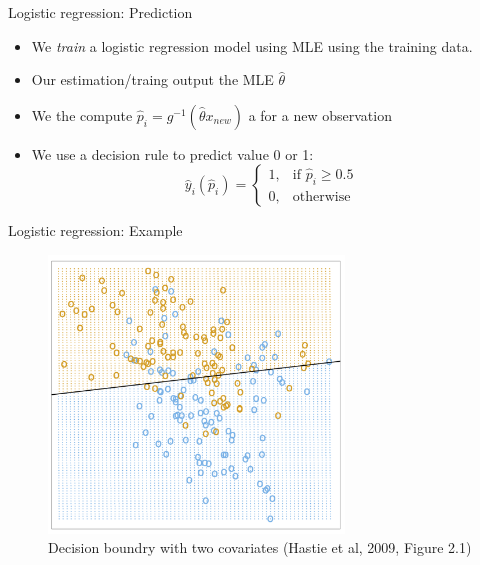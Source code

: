 \documentclass[10pt,handout]{beamer}
\begin{document}
\begin{frame}{Logistic regression: Prediction}
\begin{itemize}
\item We \emph{train} a logistic regression model using MLE using the training data.
\item Our estimation/traing output the MLE $\hat{\theta}$
\item We the compute $\hat{p}_i = g^{-1}(\hat{\theta} x_{new})$ a for a new observation
\item We use a {\color{uured} decision rule} to predict value 0 or 1:
\[
    \hat{y}_i(\hat{p}_i)=
\begin{cases}
    1,& \text{if } \hat{p}_i \geq 0.5\\
    0,              & \text{otherwise}
\end{cases}
\]
\end{itemize}
\end{frame}



\begin{frame}{Logistic regression: Example}


\begin{figure}[h]
\caption{Decision boundry with two covariates (Hastie et al, 2009, Figure 2.1) }
\centering
\includegraphics[width=0.7\textwidth]{figs/decision_fig_2_1.png}
\end{figure}

\end{frame}
\end{document}
